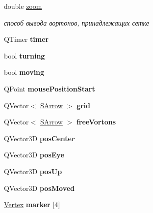 \begin{DoxyCompactItemize}
double \mbox{\hyperlink{class_main_field_a6aaab00c15ffb70fff91f8ecb080121c}{zoom}}
\begin{DoxyCompactList}\small\item\em способ вывода вортонов, принадлежащих сетке \end{DoxyCompactList}\item 
\mbox{\label{class_main_field_a7233ef32c28f7df427524018c8c2d25a}} 
Q\+Timer {\bfseries timer}
\item 
\mbox{\label{class_main_field_a7fd7d609de57b97c85ea9017008b7fc4}} 
bool {\bfseries turning}
\item 
\mbox{\label{class_main_field_aa85abd2651d5efa16ec219dda13df28f}} 
bool {\bfseries moving}
\item 
\mbox{\label{class_main_field_a404bc7f22243c20cb8b99ba700a45762}} 
Q\+Point {\bfseries mouse\+Position\+Start}
\item 
\mbox{\label{class_main_field_ad1942a9bd71e4774e05b6242faa92be8}} 
Q\+Vector$<$ \mbox{\hyperlink{struct_s_arrow}{S\+Arrow}} $>$ {\bfseries grid}
\item 
\mbox{\label{class_main_field_a7d8cffe1aedbc792e73857f2dd22a280}} 
Q\+Vector$<$ \mbox{\hyperlink{struct_s_arrow}{S\+Arrow}} $>$ {\bfseries free\+Vortons}
\item 
\mbox{\label{class_main_field_ab2159b7b43b8e9e44f8a05239c0ab630}} 
Q\+Vector3D {\bfseries pos\+Center}
\item 
\mbox{\label{class_main_field_abf90134d1cecf76de8e7788b5401e4e2}} 
Q\+Vector3D {\bfseries pos\+Eye}
\item 
\mbox{\label{class_main_field_a268288b7451a8fa8003398dd0e4043fe}} 
Q\+Vector3D {\bfseries pos\+Up}
\item 
\mbox{\label{class_main_field_af5c8eac20542b79047bd771e4878c3de}} 
Q\+Vector3D {\bfseries pos\+Moved}
\item 
\mbox{\label{class_main_field_a4dceba709d056a412ffa6d0b9c071ed9}} 
\mbox{\hyperlink{struct_vertex}{Vertex}} {\bfseries marker} \mbox{[}4\mbox{]}
\end{DoxyCompactItemize}


